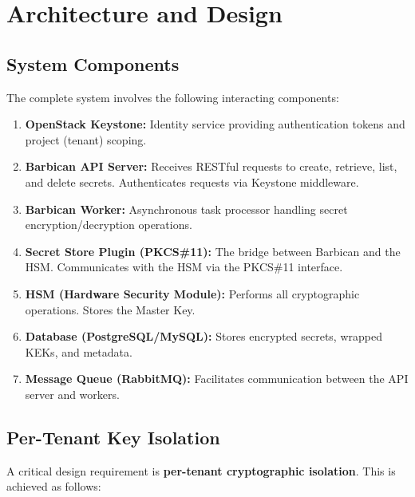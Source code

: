 \documentclass[12pt,a4paper,oneside]{report}
\begin{document}
\section{Architecture and Design}

\subsection{System Components}

The complete system involves the following interacting components:

\begin{enumerate}
    \item \textbf{OpenStack Keystone:} Identity service providing authentication tokens and project (tenant) scoping.
    \item \textbf{Barbican API Server:} Receives RESTful requests to create, retrieve, list, and delete secrets. Authenticates requests via Keystone middleware.
    \item \textbf{Barbican Worker:} Asynchronous task processor handling secret encryption/decryption operations.
    \item \textbf{Secret Store Plugin (PKCS\#11):} The bridge between Barbican and the HSM. Communicates with the HSM via the PKCS\#11 interface.
    \item \textbf{HSM (Hardware Security Module):} Performs all cryptographic operations. Stores the Master Key.
    \item \textbf{Database (PostgreSQL/MySQL):} Stores encrypted secrets, wrapped KEKs, and metadata.
    \item \textbf{Message Queue (RabbitMQ):} Facilitates communication between the API server and workers.
\end{enumerate}

\subsection{Per-Tenant Key Isolation}

A critical design requirement is \textbf{per-tenant cryptographic isolation}. This is achieved as follows:
\end{document}
